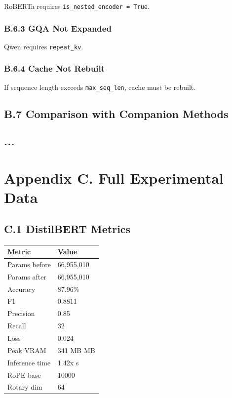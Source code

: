 RoBERTa requires \texttt{is\_nested\_encoder = True}.

\subsubsection{B.6.3 GQA Not Expanded}

Qwen requires \texttt{repeat\_kv}.

\subsubsection{B.6.4 Cache Not Rebuilt}

If sequence length exceeds \texttt{max\_seq\_len}, cache must be rebuilt.

\subsection{B.7 Comparison with Companion Methods}

\begin{lstlisting}

---
\end{lstlisting}


\section{Appendix C. Full Experimental Data}

\subsection{C.1 DistilBERT Metrics}

\begin{table}[H]
\centering
\small
\begin{tabular}{ll}
\toprule
\textbf{Metric} & \textbf{Value} \\
\midrule
Params before & 66,955,010 \\
Params after & 66,955,010 \\
Accuracy & 87.96\% \\
F1 & 0.8811 \\
Precision & 0.85 \\
Recall & 32 \\
Loss & 0.024 \\
Peak VRAM & 341 MB MB \\
Inference time & 1.42x s \\
RoPE base & 10000 \\
Rotary dim & 64 \\
\bottomrule
\end{tabular}
\end{table}

